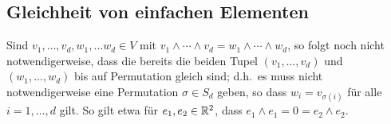 \subsection{Gleichheit von einfachen Elementen}

Sind $v_1, \dotsc, v_d, w_1, \dotsc w_d \in V$ mit $v_1 \wedge \dotsb \wedge v_d = w_1 \wedge \dotsb \wedge w_d$, so folgt noch nicht notwendigerweise, dass die bereits die beiden Tupel $(v_1, \dotsc, v_d)$ und $(w_1, \dotsc, w_d)$ bis auf Permutation gleich sind;
d.h.\ es muss nicht notwendigerweise eine Permutation $\sigma \in S_d$ geben, so dass $w_i = v_{\sigma(i)}$ für alle $i = 1, \dotsc, d$ gilt.
So gilt etwa für $e_1, e_2 \in \mathbb{R}^2$, dass $e_1 \wedge e_1 = 0 = e_2 \wedge e_2$.

% 
% 
% 
